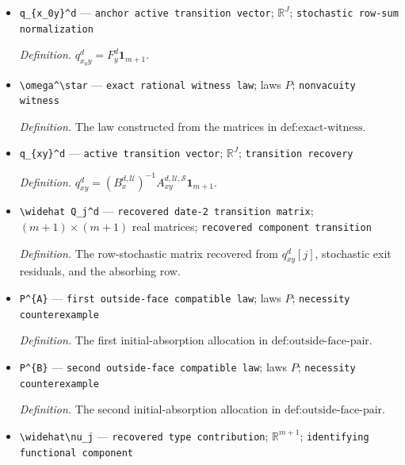 \documentclass{article}
\begin{document}
\begin{itemize}
  \par\smallskip\noindent\emph{Definition.} The rows \(\mathcal U\) of \(B_x^{d,\mathcal A}\).
  \item \texttt{q\_\allowbreak{}\{x\_\allowbreak{}0y\}\allowbreak{}\textasciicircum{}d} --- \texttt{anchor active transition vector}; \(\mathbb R^J\); \texttt{stochastic row-\allowbreak{}sum normalization}
  \par\smallskip\noindent\emph{Definition.} \(q_{x_0y}^d=F_y^d\mathbf1_{m+1}\).
  \item \texttt{\textbackslash{}\allowbreak{}omega\textasciicircum{}\textbackslash{}\allowbreak{}star} --- \texttt{exact rational witness law}; laws \(P\); \texttt{nonvacuity witness}
  \par\smallskip\noindent\emph{Definition.} The law constructed from the matrices in \(\text{def:exact-witness}\).
  \item \texttt{q\_\allowbreak{}\{xy\}\allowbreak{}\textasciicircum{}d} --- \texttt{active transition vector}; \(\mathbb R^J\); \texttt{transition recovery}
  \par\smallskip\noindent\emph{Definition.} \(q_{xy}^d=(B_x^{d,\mathcal U})^{-1}A_{xy}^{d,\mathcal U,\mathcal S}\mathbf1_{m+1}\).
  \item \texttt{\textbackslash{}\allowbreak{}widehat Q\_\allowbreak{}j\textasciicircum{}d} --- \texttt{recovered date-\allowbreak{}2 transition matrix}; \((m+1)\times(m+1)\) real matrices; \texttt{recovered component transition}
  \par\smallskip\noindent\emph{Definition.} The row-stochastic matrix recovered from \(q_{xy}^d[j]\), stochastic exit residuals, and the absorbing row.
  \item \texttt{P\textasciicircum{}\{A\}\allowbreak{}} --- \texttt{first outside-\allowbreak{}face compatible law}; laws \(P\); \texttt{necessity counterexample}
  \par\smallskip\noindent\emph{Definition.} The first initial-absorption allocation in \(\text{def:outside-face-pair}\).
  \item \texttt{P\textasciicircum{}\{B\}\allowbreak{}} --- \texttt{second outside-\allowbreak{}face compatible law}; laws \(P\); \texttt{necessity counterexample}
  \par\smallskip\noindent\emph{Definition.} The second initial-absorption allocation in \(\text{def:outside-face-pair}\).
  \item \texttt{\textbackslash{}\allowbreak{}widehat\textbackslash{}\allowbreak{}nu\_\allowbreak{}j} --- \texttt{recovered type contribution}; \(\mathbb R^{m+1}\); \texttt{identifying functional component}

\end{itemize}
\end{document}
